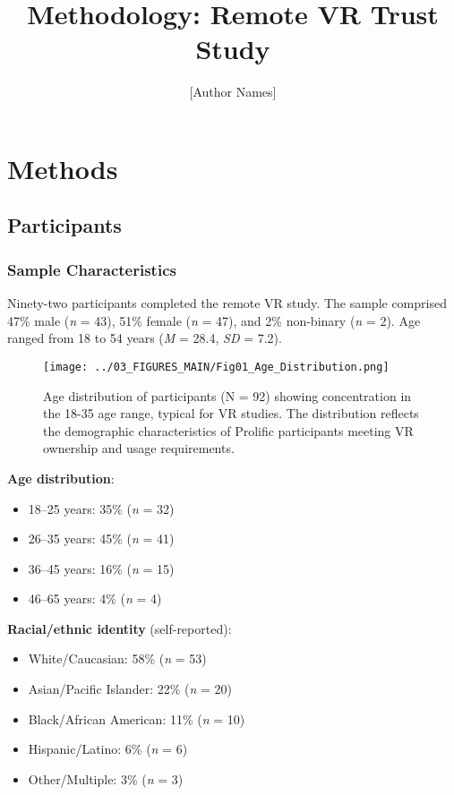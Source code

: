 \documentclass[12pt]{article}
\title{\textbf{Methodology: Remote VR Trust Study}}
\author{[Author Names]}
\date{}
\begin{document}
\maketitle

\section{Methods}

\subsection{Participants}

\subsubsection{Sample Characteristics}

Ninety-two participants completed the remote VR study. The sample comprised 47\% male (\textit{n} = 43), 51\% female (\textit{n} = 47), and 2\% non-binary (\textit{n} = 2). Age ranged from 18 to 54 years (\textit{M} = 28.4, \textit{SD} = 7.2).

\begin{figure}[h]
\centering
\texttt{[image: ../03\_FIGURES\_MAIN/Fig01\_Age\_Distribution.png]}
\caption{Age distribution of participants (N = 92) showing concentration in the 18-35 age range, typical for VR studies. The distribution reflects the demographic characteristics of Prolific participants meeting VR ownership and usage requirements.}
\label{fig:sample_demographics}
\end{figure}

\textbf{Age distribution}:
\begin{itemize}
    \item 18--25 years: 35\% (\textit{n} = 32)
    \item 26--35 years: 45\% (\textit{n} = 41)
    \item 36--45 years: 16\% (\textit{n} = 15)
    \item 46--65 years: 4\% (\textit{n} = 4)
\end{itemize}

\textbf{Racial/ethnic identity} (self-reported):
\begin{itemize}
    \item White/Caucasian: 58\% (\textit{n} = 53)
    \item Asian/Pacific Islander: 22\% (\textit{n} = 20)
    \item Black/African American: 11\% (\textit{n} = 10)
    \item Hispanic/Latino: 6\% (\textit{n} = 6)
    \item Other/Multiple: 3\% (\textit{n} = 3)
\end{itemize}
\end{document}
